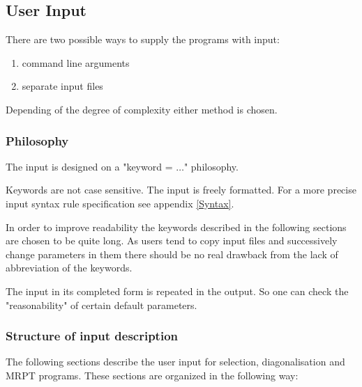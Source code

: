 \subsection{User Input}

There are two possible ways to supply the programs with input:
\begin{enumerate}
\item command line arguments
\item separate input files
\end{enumerate}
Depending of the degree of complexity either method is chosen.



\subsubsection{Philosophy}



The input is designed on a "keyword = $\ldots$" philosophy.

Keywords are not case sensitive. The input is freely formatted.
For a more precise input syntax rule specification see appendix \ref{Syntax}.


In order to improve readability the keywords described in the following 
sections are chosen to be quite long.
As users tend to copy input files and successively
change parameters in them there should be no real drawback from the
lack of abbreviation of the keywords.

The input in its completed form is repeated in the output. So one
can check the "reasonability" of certain default parameters.


\subsubsection{Structure of input description}

The following sections describe the user input for selection,
diagonalisation and MRPT programs. These sections are organized
in the following way:


